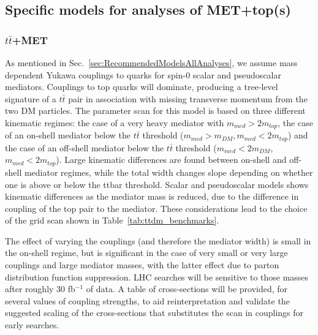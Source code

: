 \documentclass[debug,notitlepage]{dmfm}
\newcommand{\mdm}{\ensuremath{m_{DM}}\xspace}
\newcommand{\mmed}{\ensuremath{m_{med}}\xspace}
\begin{document}
\subsection{Specific models for analyses of MET+top(s)}
\label{sub:SPttbar}

\subsubsection{$t \bar{t}$+MET}

As mentioned in Sec.~\ref{sec:RecommendedModelsAllAnalyses}, we assume 
mass dependent Yukawa couplings to quarks for spin-$0$ scalar
and pseudoscalar mediators. Couplings to top quarks will dominate, 
producing a tree-level signature of a $t \bar{t}$ pair
in association with missing transverse momentum from the two DM particles.
The parameter scan for this model is based on three different kinematic
regimes: the case of a very heavy mediator with $m_{med} > 2 m_{top}$, 
the case of an on-shell mediator below the $t\bar{t}$ threshold
($\mmed >  \mdm, 
 \mmed < 2 m_{top}$) and the case of an off-shell mediator below
the $t\bar{t}$ threshold ($m_{med} < 2 m_{DM}$, $m_{med} < 2 m_{top}$). 
Large kinematic differences are found between on-shell and off-shell mediator
regimes, while the total width changes slope depending on whether one
is above or below the ttbar threshold. 
Scalar and pseudoscalar models shows kinematic differences as the mediator mass 
is reduced, due to the difference in coupling of the top pair to the mediator. 
These considerations lead to the choice of the grid scan shown in 
Table~\ref{tab:ttdm_benchmarks}.

The effect of varying the couplings (and therefore the mediator width) 
is small in the on-shell regime, but is significant in the case of
very small or very large couplings and large mediator masses, 
with the latter effect due to parton distribution function suppression. 
LHC searches will be sensitive to those masses after roughly 30 fb$^{-1}$ of data. 
A table of cross-sections will be provided, for several values of coupling strengths,
to aid reinterpretation and validate the suggested scaling of the cross-sections
that substitutes the scan in couplings for early searches. 
\end{document}
